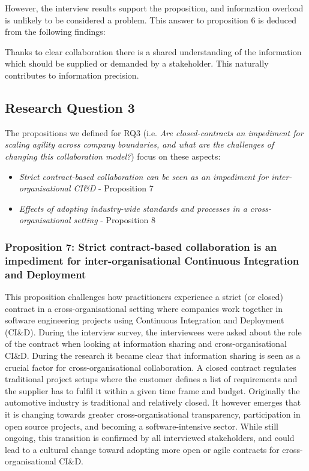However, the interview results support the proposition, and information overload is unlikely to be considered a problem. This answer to proposition 6 is deduced from the following findings:

 Thanks to clear collaboration there is a shared understanding of the information which should be supplied or demanded by a stakeholder. This naturally contributes to information precision.

\subsection{Research Question 3}\label{sec:ResearchQuestion3}

The propositions we defined for  
RQ3 (i.e. {\em Are closed-contracts an impediment for scaling agility across company boundaries, and what are the challenges of changing this collaboration model?}) focus on these aspects:

\begin{itemize}
\item {\em Strict contract-based collaboration can be seen as an impediment for inter-organisational CI\&D}  - Proposition 7 
\item {\em Effects of adopting industry-wide standards and processes in a cross-organisational setting} - Proposition 8 
\end{itemize}

\subsubsection{Proposition 7: Strict contract-based collaboration is an impediment for inter-organisational Continuous Integration and Deployment}

This proposition challenges how practitioners experience a strict (or closed) contract in a cross-organisational setting where companies work together in software engineering projects using Continuous Integration and Deployment (CI\&D). During the interview survey, the interviewees were asked about the role of the contract when looking at information sharing and cross-organisational CI\&D. During the research it became clear that information sharing is seen as a crucial factor for cross-organisational collaboration. A closed contract regulates traditional project setups where the customer defines a list of requirements and the supplier has to fulfil it within a given time frame and budget. Originally the automotive industry is traditional and relatively closed. It however emerges that it is changing towards greater cross-organisational transparency, participation in open source projects, and becoming a software-intensive sector. While still ongoing, this transition is confirmed by all interviewed stakeholders, and could lead to a cultural change toward adopting more open or agile contracts for cross-organisational CI\&D.

